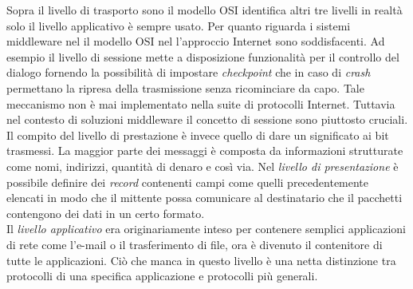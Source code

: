Sopra il livello di trasporto sono il modello OSI identifica altri tre livelli in realtà solo il livello applicativo è sempre usato. Per quanto riguarda i sistemi middleware nel il modello OSI nel l'approccio Internet sono soddisfacenti. Ad esempio il livello di sessione mette a disposizione funzionalità per il controllo del dialogo fornendo la possibilità di impostare \emph{checkpoint} che in caso di \emph{crash} permettano la ripresa della trasmissione senza ricominciare da capo. Tale meccanismo non è mai implementato nella suite di protocolli Internet. Tuttavia nel contesto di soluzioni middleware il concetto di sessione sono piuttosto cruciali.
Il compito del livello di prestazione è invece quello di dare un significato ai bit trasmessi. La maggior parte dei messaggi è composta da informazioni strutturate come nomi, indirizzi, quantità di denaro e così via. Nel \emph{livello di presentazione} è possibile definire dei \emph{record} contenenti campi come quelli precedentemente elencati in modo che il mittente possa comunicare al destinatario che il pacchetti contengono dei dati in un certo formato.\\
Il \emph{livello applicativo} era originariamente inteso per contenere semplici applicazioni di rete come l'e-mail o il trasferimento di file, ora è divenuto il contenitore di tutte le applicazioni. Ciò che manca in questo livello è una netta distinzione tra protocolli di una specifica applicazione e protocolli più generali.
